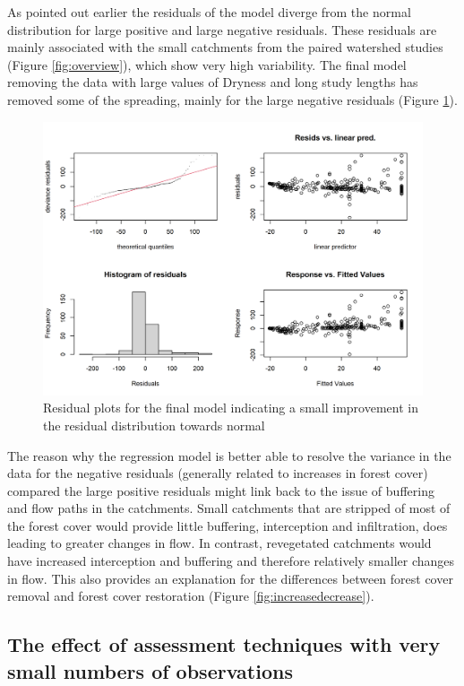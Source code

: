 \documentclass[]{elsarticle} %
\begin{document}
As pointed out earlier the residuals of the model diverge from the normal distribution for large positive and large negative residuals. These residuals are mainly associated with the small catchments from the paired watershed studies (Figure \ref{fig:overview}), which show very high variability. The final model removing the data with large values of Dryness and long study lengths has removed some of the spreading, mainly for the large negative residuals (Figure \ref{fig:gamcheck7}).

\begin{figure}
\includegraphics[width=0.9\linewidth]{residual_plot_model1} \caption{Residual plots for the final model indicating a small improvement in the residual distribution towards normal}\label{fig:gamcheck7}
\end{figure}

The reason why the regression model is better able to resolve the variance in the data for the negative residuals (generally related to increases in forest cover) compared the large positive residuals might link back to the issue of buffering and flow paths in the catchments. Small catchments that are stripped of most of the forest cover would provide little buffering, interception and infiltration, does leading to greater changes in flow. In contrast, revegetated catchments would have increased interception and buffering and therefore relatively smaller changes in flow. This also provides an explanation for the differences between forest cover removal and forest cover restoration (Figure \ref{fig:increasedecrease}).

\hypertarget{the-effect-of-assessment-techniques-with-very-small-numbers-of-observations}{%
\subsection{The effect of assessment techniques with very small numbers of observations}\label{the-effect-of-assessment-techniques-with-very-small-numbers-of-observations}}
\end{document}
